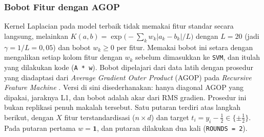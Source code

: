 \subsubsection{Bobot Fitur dengan AGOP}
\label{subsubsec:svm-agop-teori}
Kernel Laplacian pada model terbaik tidak memakai fitur standar secara langsung, melainkan $K(a, b) = \exp\big(-\sum_k w_k|a_k - b_k| / L\big)$ dengan $L = 20$ (jadi $\gamma = 1/L = 0{,}05$) dan bobot $w_k \ge 0$ per fitur. Memakai bobot ini setara dengan mengalikan setiap kolom fitur dengan $w_k$ sebelum dimasukkan ke \texttt{SVM}, dan itulah yang dilakukan kode (\texttt{A * w}). Bobot dipelajari dari data latih dengan prosedur yang diadaptasi dari \textit{Average Gradient Outer Product} (AGOP) pada \textit{Recursive Feature Machine} \cite{radhakrishnan2024rfm}. Versi di sini disederhanakan: hanya diagonal AGOP yang dipakai, jaraknya L1, dan bobot adalah akar dari RMS gradien. Prosedur ini bukan replikasi penuh makalah tersebut. Satu putaran terdiri atas langkah berikut, dengan $X$ fitur terstandardisasi ($n \times d$) dan target $t_i = y_i - \tfrac12 \in \{\pm\tfrac12\}$. Pada putaran pertama $w = \mathbf{1}$, dan putaran dilakukan dua kali (\texttt{ROUNDS = 2}).

